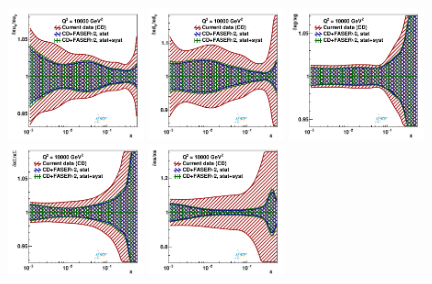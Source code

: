 \begin{figure}[t]
\centering
\includegraphics[width=0.32\textwidth]{plots/proton_fasernu2/inclusive+charm_chargediscrimination/syst_FASERv2_q2_10000_pdf_uv_ratio.pdf}
\includegraphics[width=0.32\textwidth]{plots/proton_fasernu2/inclusive+charm_chargediscrimination/syst_FASERv2_q2_10000_pdf_dv_ratio.pdf}
\includegraphics[width=0.32\textwidth]{plots/proton_fasernu2/inclusive+charm_chargediscrimination/syst_FASERv2_q2_10000_pdf_g_ratio.pdf}\\
\includegraphics[width=0.32\textwidth]{plots/proton_fasernu2/inclusive+charm_chargediscrimination/syst_FASERv2_q2_10000_pdf_Sea_ratio.pdf}
\includegraphics[width=0.32\textwidth]{plots/proton_fasernu2/inclusive+charm_chargediscrimination/syst_FASERv2_q2_10000_pdf_s_ratio.pdf}

\end{figure}
